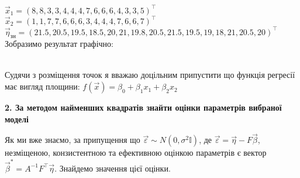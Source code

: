 \documentclass[12 pt]{article}
\begin{document}
$\vec{x}_1 = (8,8,3,3,4,4,4,7,6,6,6,4,3,3,5)^\top$ \\ 
$\vec{x}_2 = (1,1,7,7,6,6,6,3,4,4,4,7,6,6,7)^\top $  \\ 
$\vec{\eta}_\text{зн} = (21.5,20.5,19.5,18.5,20,21,19.8,20.5,21.5,19.5,19,18,21,20.5,20)^\top$ \\  
Зобразимо результат графічно:
 \begin{figure}[H]
\end{figure}
\ \\ 
Судячи з розміщення точок я вважаю доцільним припустити що функція регресії має вигляд
площини: $f(\vec{x}) = \beta_0 + \beta_1 x_1 + \beta_2 x_2$
\begin{center}
    \textbf{2. За методом найменших квадратів знайти оцінки параметрів вибраної моделі}
\end{center}
Як ми вже знаємо, за припущення що $\vec{\varepsilon} \sim N(0, \sigma^2\mathbb{I})$, де 
$\vec{\varepsilon} = \vec{\eta} - F \vec{\beta}$, 
 незміщеною, конзистентною та ефективною оцінкою параметрів є вектор
 $\vec{\beta}^* = A^{-1}F^\top \vec{\eta}$. Знайдемо значення цієї оцінки. \\ 
\end{document}
